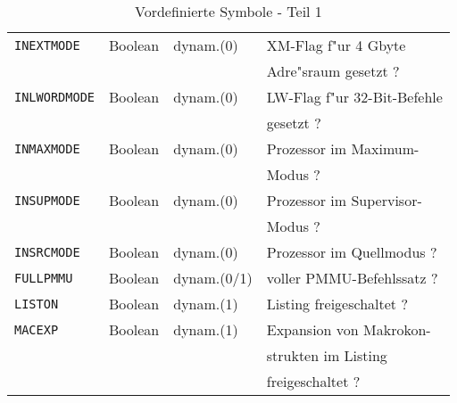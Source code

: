 \documentclass[12pt,a4paper,twoside]{report}
\newcommand{\tty}[1]{{\tt #1}}
\begin{document}
\begin{table*}[ht]
\begin{center}
\begin{tabular}{|l|l|l|l|}
\hline
\tty{INEXTMODE}  &  Boolean    & dynam.(0)  & XM-Flag f"ur 4 Gbyte \\
                 &             &            & Adre"sraum gesetzt ? \\
\hline
\tty{INLWORDMODE} & Boolean    & dynam.(0)  & LW-Flag f"ur 32-Bit-Befehle \\
                 &             &            & gesetzt ? \\
\hline
\tty{INMAXMODE}  &  Boolean    & dynam.(0)  & Prozessor im Maximum- \\
                 &             &            & Modus ? \\
\hline
\tty{INSUPMODE}  &  Boolean    & dynam.(0)  & Prozessor im Supervisor- \\
                 &             &            & Modus ? \\
\hline
\tty{INSRCMODE}  &  Boolean    & dynam.(0)  & Prozessor im Quellmodus ? \\
\hline
\tty{FULLPMMU}   &  Boolean    & dynam.(0/1) & voller PMMU-Befehlssatz ? \\
\hline
\tty{LISTON}     &  Boolean    & dynam.(1)  & Listing freigeschaltet ? \\
\hline
\tty{MACEXP}     &  Boolean    & dynam.(1)  & Expansion von Makrokon- \\
                 &             &            & strukten im Listing \\
                 &             &            & freigeschaltet ? \\
\hline
\end{tabular}\end{center}
\caption{Vordefinierte Symbole - Teil 1\label{TabInternSyms1}}
\end{table*}
\end{document}

